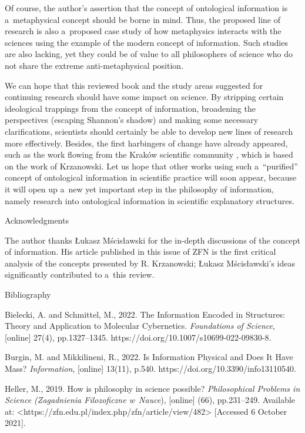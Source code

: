 Of course, the author's assertion that the concept of ontological information is a~metaphysical concept should be borne in mind. Thus, the proposed line of research is also a~proposed case study of how metaphysics interacts with the sciences using the example of the modern concept of information. Such studies are also lacking, yet they could be of value to all philosophers of science who do not share the extreme anti-metaphysical position.

We can hope that this reviewed book and the study areas suggested for continuing research should have some impact on science. By stripping certain ideological trappings from the concept of information, broadening the perspectives (escaping Shannon's shadow) and making some necessary clarifications, scientists should certainly be able to develop new lines of research more effectively. Besides, the first harbingers of change have already appeared, such as the work flowing from the Kraków scientific community
\parencite[][]{bielecki_information_2022}, %
 which is based on the work of Krzanowski. Let us hope that other works using such a~``purified'' concept of ontological information in scientific practice will soon appear, because it will open up a~new yet important step in the philosophy of information, namely research into ontological information in scientific explanatory structures.

Acknowledgments

The author thanks Łukasz Mścisławski for the in-depth discussions of the concept of information. His article
\parencite[][]{mscislawski_is_2022} %
 published in this issue of ZFN is the first critical analysis of the concepts presented by R. Krzanowski; Łukasz Mścisławski's ideas significantly contributed to a~this review.

Bibliography

Bielecki, A. and Schmittel, M., 2022. The Information Encoded in Structures: Theory and Application to Molecular Cybernetics. \textit{Foundations of Science}, [online] 27(4), pp.1327–1345. https://doi.org/10.1007/s10699-022-09830-8.

Burgin, M. and Mikkilineni, R., 2022. Is Information Physical and Does It Have Mass? \textit{Information}, [online] 13(11), p.540. https://doi.org/10.3390/info13110540.

Heller, M., 2019. How is philosophy in science possible? \textit{Philosophical Problems in Science (Zagadnienia Filozoficzne w~Nauce}), [online] (66), pp.231–249. Available at: {\textless}https://zfn.edu.pl/index.php/zfn/article/view/482{\textgreater} [Accessed 6 October 2021].

